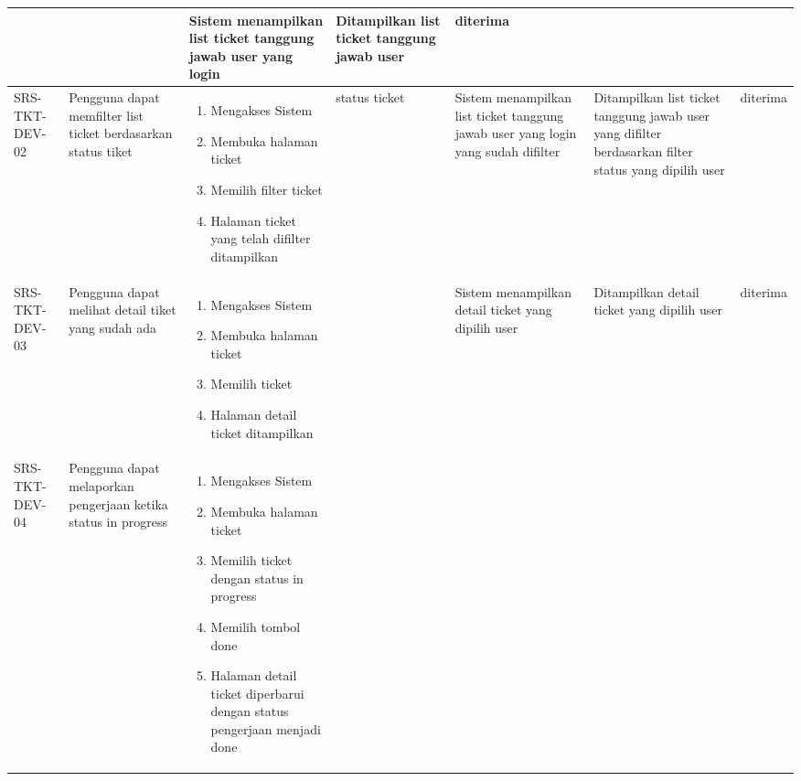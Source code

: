 \documentclass[12pt]{article}
\begin{document}
\begin{enumerate}[label=\textbf{5.\arabic*.}]
\begin{enumerate}[label=\textbf{5.2.\arabic*.}]
\begin{landscape}
\begin{longtable}{ |l|p{}|p{}|p{}|p{}|p{}|l| }
\begin{enumerate}[label=\arabic*.]
                \end{enumerate} 
                &  & Sistem menampilkan list ticket tanggung jawab user yang login & Ditampilkan list ticket tanggung jawab user & diterima \\
                \hline
                SRS-TKT-DEV-02 & Pengguna dapat memfilter list ticket berdasarkan status tiket & 
                \begin{enumerate}[label=\arabic*.] 
                    \item Mengakses Sistem
                    \item Membuka halaman ticket
                    \item Memilih filter ticket
                    \item Halaman ticket yang telah difilter ditampilkan
                \end{enumerate} 
                & status ticket & Sistem menampilkan list ticket tanggung jawab user yang login yang sudah difilter & Ditampilkan list ticket tanggung jawab user yang difilter berdasarkan filter status yang dipilih user& diterima \\
                \hline
                SRS-TKT-DEV-03 & Pengguna dapat melihat detail tiket yang sudah ada &  
                \begin{enumerate}[label=\arabic*.] 
                    \item Mengakses Sistem
                    \item Membuka halaman ticket
                    \item Memilih ticket
                    \item Halaman detail ticket ditampilkan
                \end{enumerate} 
                &  & Sistem menampilkan detail ticket yang dipilih user & Ditampilkan detail ticket yang dipilih user & diterima \\
                \hline
                SRS-TKT-DEV-04 & Pengguna dapat melaporkan pengerjaan ketika status in progress &  
                \begin{enumerate}[label=\arabic*.] 
                    \item Mengakses Sistem
                    \item Membuka halaman ticket
                    \item Memilih ticket dengan status in progress
                    \item Memilih tombol done
                    \item Halaman detail ticket diperbarui dengan status pengerjaan menjadi done

\end{enumerate}
\end{longtable}
\end{landscape}
\end{enumerate}
\end{enumerate}
\end{document}
